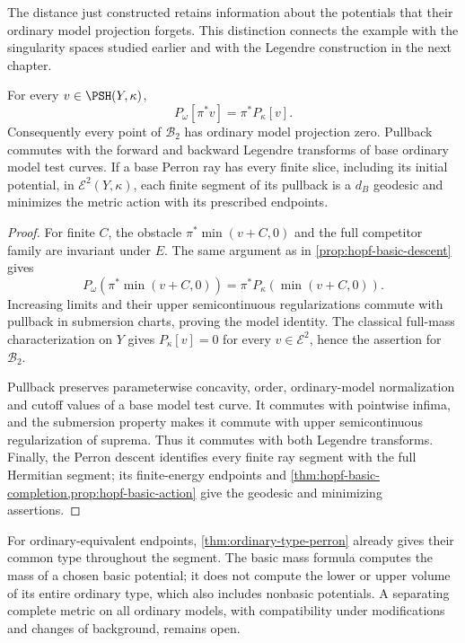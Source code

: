 The distance just constructed retains information about the potentials that their ordinary model projection forgets. This distinction connects the example with the singularity spaces studied earlier and with the Legendre construction in the next chapter.

\begin{proposition}\label{prop:hopf-basic-model-projection}
For every $v\in\PSH(Y,\kappa)$,
\[
 P_\omega[\pi^*v]=\pi^*P_\kappa[v].
\]
Consequently every point of $\mathcal B_2$ has ordinary model projection zero. Pullback commutes with the forward and backward Legendre transforms of base ordinary model test curves. If a base Perron ray has every finite slice, including its initial potential, in $\mathcal E^2(Y,\kappa)$, each finite segment of its pullback is a $d_B$ geodesic and minimizes the metric action with its prescribed endpoints.
\end{proposition}
\begin{proof}
For finite $C$, the obstacle $\pi^*\min(v+C,0)$ and the full competitor family are invariant under $E$. The same argument as in \cref{prop:hopf-basic-descent} gives
\[
 P_\omega(\pi^*\min(v+C,0))
 =\pi^*P_\kappa(\min(v+C,0)).
\]
Increasing limits and their upper semicontinuous regularizations commute with pullback in submersion charts, proving the model identity. The classical full-mass characterization on $Y$ gives $P_\kappa[v]=0$ for every $v\in\mathcal E^2$, hence the assertion for $\mathcal B_2$.

Pullback preserves parameterwise concavity, order, ordinary-model normalization and cutoff values of a base model test curve. It commutes with pointwise infima, and the submersion property makes it commute with upper semicontinuous regularization of suprema. Thus it commutes with both Legendre transforms. Finally, the Perron descent identifies every finite ray segment with the full Hermitian segment; its finite-energy endpoints and \cref{thm:hopf-basic-completion,prop:hopf-basic-action} give the geodesic and minimizing assertions.
\end{proof}

For ordinary-equivalent endpoints, \cref{thm:ordinary-type-perron} already gives their common type throughout the segment. The basic mass formula computes the mass of a chosen basic potential; it does not compute the lower or upper volume of its entire ordinary type, which also includes nonbasic potentials. A separating complete metric on all ordinary models, with compatibility under modifications and changes of background, remains open.
